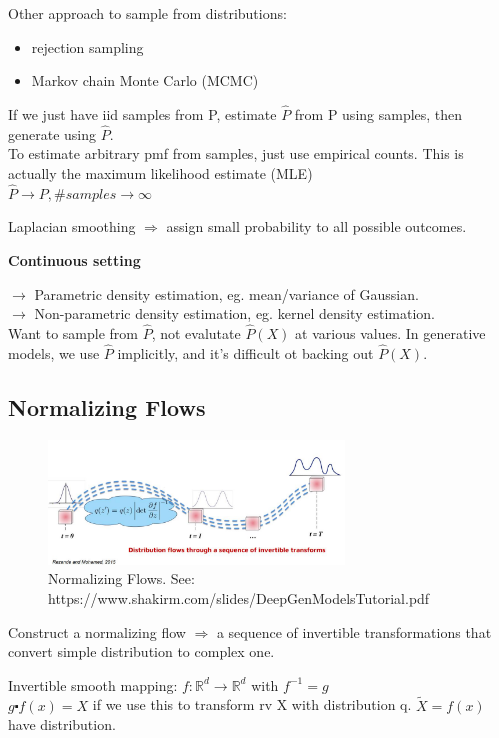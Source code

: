 \documentclass[12pt,a4paper]{article}
\begin{document}
Other approach to sample from distributions:
\begin{itemize}
\item rejection sampling
\item Markov chain Monte Carlo (MCMC)
\end{itemize}

\vspace{0.5cm}
If we just have iid samples from P, estimate $\hat{P}$ from P using samples, then generate using $\hat{P}$.\\
To estimate arbitrary pmf from samples, just use empirical counts. This is actually the maximum likelihood estimate (MLE) \\
$\hat{P}\rightarrow P, \#samples\rightarrow \infty$

Laplacian smoothing $\Rightarrow$ assign small probability to all possible outcomes. 

\textbf{Continuous setting}

$\rightarrow$ Parametric density estimation, eg. mean/variance of Gaussian. \\
$\rightarrow$ Non-parametric density estimation, eg. kernel density estimation. \\
Want to sample from $\hat{P}$, not evalutate $\hat{P}(X)$ at various values. In generative models, we use $\hat{P}$ implicitly, and it's difficult ot backing out $\hat{P}(X)$.

\subsection{Normalizing Flows}
\begin{figure}[!ht]
    \centering
    \includegraphics[width=0.7\textwidth]{fig/norm_flow.jpg}
    \caption{Normalizing Flows. See: https://www.shakirm.com/slides/DeepGenModelsTutorial.pdf}
\end{figure}

Construct a normalizing flow $\Rightarrow$ a sequence of invertible transformations that convert simple distribution to complex one. 

Invertible smooth mapping:
$f: \mathbb{R}^d\rightarrow \mathbb{R}^d$
with $f^{-1}=g$ \\
$g\centerdot f(x)=X$ if we use this to transform rv X with distribution q.
$\tilde{X}=f(x)$ have distribution. 
\end{document}
